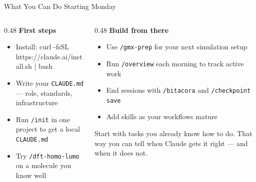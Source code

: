 \documentclass[aspectratio=169, 10pt]{beamer}
\begin{document}
\begin{frame}{What You Can Do Starting Monday}
  \begin{columns}[T]
    \begin{column}{0.48\textwidth}
      \textbf{\color{biokteal}First steps}
      \begin{itemize}[label=\textbullet]\setlength\itemsep{4pt}
        \item Install: {\small\ttfamily curl -fsSL https://claude.ai/install.sh | bash}
        \item Write your \texttt{CLAUDE.md} --- role, standards, infrastructure
        \item Run \texttt{/init} in one project to get a local \texttt{CLAUDE.md}
        \item Try \texttt{/dft-homo-lumo} on a molecule you know well
      \end{itemize}
    \end{column}
    \begin{column}{0.48\textwidth}
      \textbf{\color{biokteal}Build from there}
      \begin{itemize}[label=\textbullet]\setlength\itemsep{4pt}
        \item Use \texttt{/gmx-prep} for your next simulation setup
        \item Run \texttt{/overview} each morning to track active work
        \item End sessions with \texttt{/bitacora} and \texttt{/checkpoint save}
        \item Add skills as your workflows mature
      \end{itemize}
      \vspace{0.5em}
      \begin{block}{}
        \small Start with tasks you already know how to do. That way you can tell when Claude gets it right --- and when it does not.
      \end{block}
    \end{column}
  \end{columns}
\end{frame}
\end{document}
